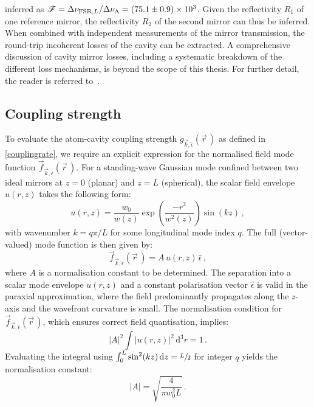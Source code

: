 \documentclass[../Thesis-IJspeert.tex]{subfiles}
\begin{document}
inferred as $\mathcal{F} = {\Delta\nu_{\mathrm{FSR},L}}/{\Delta \nu_\mathrm{A}} = \num{75.1 \pm 0.9e3}$. Given the reflectivity $R_1$ of one reference mirror, the reflectivity $R_2$ of the second mirror can thus be inferred. When combined with independent measurements of the mirror transmission, the round-trip incoherent losses of the cavity can be extracted. A comprehensive discussion of cavity mirror losses, including a systematic breakdown of the different loss mechanisms, is beyond the scope of this thesis. For further detail, the reader is referred to~\cite{doherty2021a}.

\subsection{Coupling strength}
To evaluate the atom-cavity coupling strength $g_{\vec{k},\hat{\epsilon}}(\vec{r}\,)$ as defined in \autoref{couplingrate}, we require an explicit expression for the normalised field mode function $\vec{f}_{\vec{k},\hat{\epsilon}}(\vec{r}\,)$. For a standing-wave Gaussian mode confined between two ideal mirrors at $z = 0$ (planar) and $z = L$ (spherical), the scalar field envelope $u(r, z)$ takes the following form:
\begin{equation}
u(r, z) = \frac{w_0}{w(z)} \exp\left( \frac{-r^2}{w^2(z)} \right) \sin(kz)\,,
\end{equation}
with wavenumber $k = q\pi / L$ for some longitudinal mode index $q$. The full (vector-valued) mode function is then given by:
\begin{equation}
\vec{f}_{\vec{k},\hat{\epsilon}}(\vec{r}\,) = A\, u(r, z)\, \hat{\epsilon}\,,
\end{equation}
where $A$ is a normalisation constant to be determined. The separation into a scalar mode envelope $u(r, z)$ and a constant polarisation vector $\hat{\epsilon}$ is valid in the paraxial approximation, where the field predominantly propagates along the $z$-axis and the wavefront curvature is small. The normalisation condition for $\vec{f}_{\vec{k},\hat{\epsilon}}(\vec{r}\,)$, which ensures correct field quantisation, implies:
\begin{equation}
\lvert A \rvert^2 \int \lvert u(r, z) \rvert^2\, \mathrm{d}^3 r = 1\,.
\end{equation}
Evaluating the integral using $\int_0^L \sin^2(kz)\, \mathrm{d}z = \sfrac{L}{2}$ for integer $q$ yields the normalisation constant:
\begin{equation}
\lvert A \rvert = \sqrt{\frac{4}{\pi w_0^2 L}}\,.
\end{equation}
\end{document}
